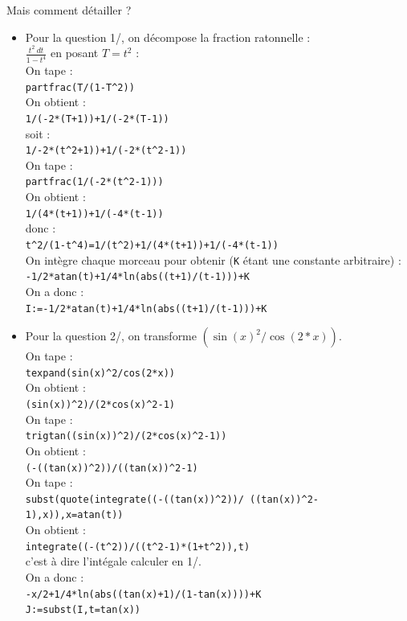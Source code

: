 \documentclass[a4paper,11pt]{book}
\begin{document}
Mais comment d\'etailler ?
\begin{itemize}
\item Pour la question 1/, on d\'ecompose la fraction ratonnelle :\\
$\displaystyle \frac{t^2\ dt }{1-t^4}$ en posant $T=t^2$ :\\
On tape :\\
{\tt partfrac(T/(1-T\verb|^|2))}\\
On obtient :\\
{\tt 1/(-2*(T+1))+1/(-2*(T-1))}\\
soit :\\
{\tt 1/-2*(t\verb|^|2+1))+1/(-2*(t\verb|^|2-1))}\\
On tape :\\
{\tt partfrac(1/(-2*(t\verb|^|2-1)))}\\
On obtient :\\
{\tt 1/(4*(t+1))+1/(-4*(t-1))}\\
donc :\\
{\tt t\verb|^|2/(1-t\verb|^|4)=1/(t\verb|^|2)+1/(4*(t+1))+1/(-4*(t-1))}\\
On int\`egre chaque morceau pour obtenir ({\tt K} \'etant une constante 
arbitraire) :\\
{\tt -1/2*atan(t)+1/4*ln(abs((t+1)/(t-1)))+K}\\
On a donc :\\
{\tt I:=-1/2*atan(t)+1/4*ln(abs((t+1)/(t-1)))+K}\\

\item Pour la question 2/, on transforme $(\sin(x)^2/\cos(2*x))$.\\ 
On tape :\\
{\tt texpand(sin(x)\verb|^|2/cos(2*x))}\\
On obtient :\\
{\tt (sin(x)\verb|)^|2)/(2*cos(x)\verb|^|2-1)}\\
On tape :\\
{\tt trigtan((sin(x)\verb|)^|2)/(2*cos(x)\verb|^|2-1))}\\
On obtient :\\
{\tt (-((tan(x))\verb|^|2))/((tan(x))\verb|^|2-1)}\\
On tape :\\
{\tt subst(quote(integrate((-((tan(x))\verb|^|2))/ ((tan(x))\verb|^|2-1),x)),x=atan(t))}\\
On obtient :\\
{\tt integrate((-(t\verb|^|2))/((t\verb|^|2-1)*(1+t\verb|^|2)),t)}\\
c'est \`a dire l'int\'egale calculer en 1/.\\
On a donc :\\
{\tt -x/2+1/4*ln(abs((tan(x)+1)/(1-tan(x))))+K}\\
{\tt J:=subst(I,t=tan(x))}
\end{itemize}
\end{document}
